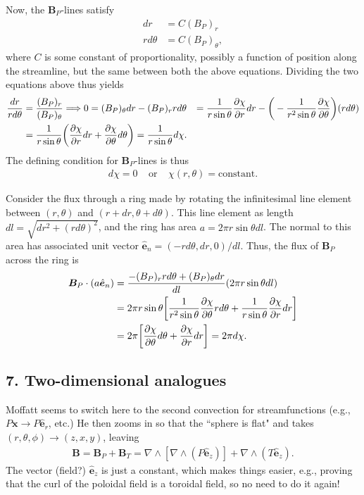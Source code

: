 \documentclass[12pt]{article} %
\newcommand{\pderiv}[2]{\frac{\partial#1}{\partial#2}}
\newcommand{\orr}{\text{or}\ \ \ \ \ }
\newcommand{\five}{\ \ \ \ \ }
\newcommand{\e}{\hat{\bm{e}}}
\begin{document}
Now, the $\bm{B}_P$-lines satisfy 
\begin{align*}
dr &= C (B_P)_r\\
r d\theta &= C (B_P)_\theta,
\end{align*}
where $C$ is some constant of proportionality, possibly a function of position along the streamline, but the same between both the above equations. Dividing the two equations above thus yields
\begin{align*}
\frac{dr}{rd\theta} &= \frac{(B_P)_r}{(B_P)_\theta}\Longrightarrow
0 = (B_P)_\theta dr - (B_P)_r rd\theta &= \frac{1}{r\sin\theta}\pderiv{\chi}{r}dr - \bigg{(}-\frac{1}{r^2\sin\theta}\pderiv{\chi}{\theta}\bigg{)}(rd\theta)\\
&= \frac{1}{r\sin\theta}\bigg{(}\pderiv{\chi}{r}dr + \pderiv{\chi}{\theta}d\theta\bigg{)} = \frac{1}{r\sin\theta}d\chi.
\end{align*}
The defining condition for $\bm{B}_P$-lines is thus
\begin{align*}
d\chi = 0\five \orr \chi(r,\theta) = \text{constant}.
\end{align*}

Consider the flux through a ring made by rotating the infinitesimal line element between $(r,\theta)$ and $(r+dr,\theta + d\theta)$. This line element as length $dl=\sqrt{dr^2+(rd\theta)^2}$, and the ring has area $a = 2\pi r\sin\theta dl$. The normal to this area has associated unit vector $\e_n = (-rd\theta, dr, 0)/dl$. Thus, the flux of $\bm{B}_P$ across the ring is
\begin{align*}
\bm{B}_P\cdot(a \e_n) &= \frac{-(B_P)_rrd\theta+ (B_P)_\theta dr}{dl}(2\pi r\sin\theta dl)\\
&= 2\pi r\sin\theta\bigg{[}\frac{1}{r^2\sin\theta}\pderiv{\chi}{\theta} r d\theta + \frac{1}{r\sin\theta}\pderiv{\chi}{r}dr\bigg{]}\\
&= 2\pi\bigg{[}\pderiv{\chi}{\theta} d\theta + \pderiv{\chi}{r}dr\bigg{]} = 2\pi d\chi.
\end{align*}

\subsection*{7. Two-dimensional analogues}
Moffatt seems to switch here to the second convection for streamfunctions (e.g., $P\bm{x}\rightarrow P\e_r$, etc.) He then zooms in so that the ``sphere is flat" and takes $(r,\theta,\phi)\rightarrow(z,x,y)$, leaving
\begin{align*}
\bm{B} = \bm{B}_P + \bm{B}_T = \nabla\wedge[\nabla\wedge(P\e_z)] + \nabla\wedge(T\e_z).
\end{align*}
The vector (field?) $\e_z$ is just a constant, which makes things easier, e.g., proving that the curl of the poloidal field is a toroidal field, so no need to do it again!
\end{document}
